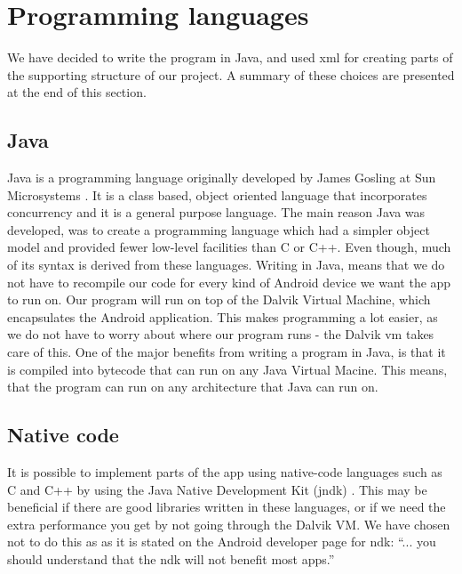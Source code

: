 
\section{Programming languages}
We have decided to write the program in Java, and used \gls{xml} for creating parts of the supporting structure of our project. A summary of these choices are presented at the end of this section.

\pagebreak

\subsection{Java}

Java is a programming language originally developed by James Gosling at Sun Microsystems \cite{bib:java}. It is a class based, object oriented language that incorporates concurrency and it is a general purpose language. The main reason Java was developed, was to create a programming language which had a simpler object model and provided fewer low-level facilities than C or C++. Even though, much of its syntax is derived from these languages.
\newline
\newline
Writing in Java, means that we do not have to recompile our code for every kind of Android device we want the app to run on. Our program will run on top of the Dalvik Virtual Machine, which encapsulates the Android application. This makes programming a lot easier, as we do not have to worry about where our program runs - the Dalvik \gls{vm} takes care of this.
\newline
\newline
One of the major benefits from writing a program in Java, is that it is compiled into bytecode that can run on any Java Virtual Macine. This means, that the program can run on any architecture that Java can run on.

\subsection{Native code}
It is possible to implement parts of the app using native-code languages such as C and C++ by using the Java Native Development Kit (\gls{jndk}) \cite{bib:andk}. This may be beneficial if there are good libraries written in these languages, or if we need the extra performance you get by not going through the Dalvik VM. We have chosen not to do this as as it is stated on the Android developer page for \gls{ndk}: “... you should understand that the \gls{ndk} will not benefit most apps.”

